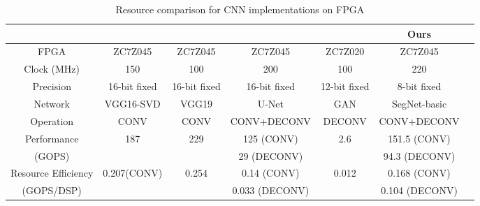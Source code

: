 \documentclass[conference]{IEEEtran}
\begin{document}
\begin{table*}[!htb]
    \centering
    \caption{Resource comparison for CNN implementations on FPGA}
    \label{tab:comparison}
    \begin{adjustbox}{width=0.9\textwidth}
    \begin{tabular}{|c|c|c|c|c|c|c|} 
        \hline
        & \cite{ref:ref_13} & \cite{ref:ref_18} &  \cite{ref:shuanglong_2018} & \cite{ref:xinyu_2017} & Ours\\
        \hline
        FPGA & ZC7Z045 & ZC7Z045 & ZC7Z045 & ZC7Z020 & ZC7Z045 \\
        \hline
        Clock (MHz) & 150& 100 & 200 & 100 & 220 \\
        \hline
        Precision & 16-bit fixed & 16-bit fixed & 16-bit fixed & 12-bit fixed & 8-bit fixed\\
        \hline
        Network & VGG16-SVD  & VGG19  & U-Net  &  GAN & SegNet-basic \\
        \hline
        Operation & CONV & CONV & CONV+DECONV & DECONV & CONV+DECONV \\
        \hline
        Performance & \multirow{2}{*}{187} & \multirow{2}{*}{229} & 125 (CONV) & \multirow{2}{*}{2.6} & 151.5 (CONV) \\
        (GOPS) &  &  & 29 (DECONV)  &  & 94.3 (DECONV)\\
        \hline
        Resource Efficiency & \multirow{2}{*}{0.207(CONV)} &  \multirow{2}{*}{0.254} & 0.14 (CONV) & \multirow{2}{*}{0.012} & 0.168 (CONV) \\
        (GOPS/DSP)  & & & 0.033 (DECONV) & & 0.104 (DECONV)\\
        \hline
    \end{tabular}
    \end{adjustbox}
\end{table*}
\end{document}
